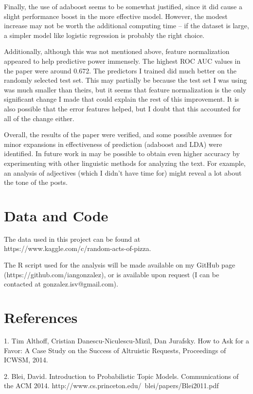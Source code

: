 \documentclass{article}\usepackage[]{graphicx}\usepackage[]{color}
\begin{document}
Finally, the use of adaboost seems to be somewhat justified, since it did cause a slight performance boost in the more effective model. However, the modest increase may not be worth the additional computing time -- if the dataset is large, a simpler model like logistic regression is probably the right choice.

Additionally, although this was not mentioned above, feature normalization appeared to help predictive power immensely. The highest ROC AUC values in the paper were around 0.672. The predictors I trained did much better on the randomly selected test set. This may partially be because the test set I was using was much smaller than theirs, but it seems that feature normalization is the only significant change I made that could explain the rest of this improvement. It is also possible that the error features helped, but I doubt that this accounted for all of the change either.

Overall, the results of the paper were verified, and some possible avenues for minor expansions in effectiveness of prediction (adaboost and LDA) were identified. In future work in may be possible to obtain even higher accuracy by experimenting with other linguistic methods for analyzing the text. For example, an analysis of adjectives (which I didn't have time for) might reveal a lot about the tone of the posts.

\section{Data and Code}

The data used in this project can be found at https://www.kaggle.com/c/random-acts-of-pizza.

The R script used for the analysis will be made available on my GitHub page (https://github.com/iangonzalez), or is available upon request (I can be contacted at gonzalez.isv@gmail.com).

\section{References}

\hspace{4mm} 1. Tim Althoff, Cristian Danescu-Niculescu-Mizil, Dan Jurafsky. How to Ask for a Favor: A Case Study on the Success of Altruistic Requests, Proceedings of ICWSM, 2014.
 
\vspace{3mm}
 
2. Blei, David. Introduction to Probabilistic Topic Models. Communications of the ACM 2014. http://www.cs.princeton.edu/~blei/papers/Blei2011.pdf
\end{document}
